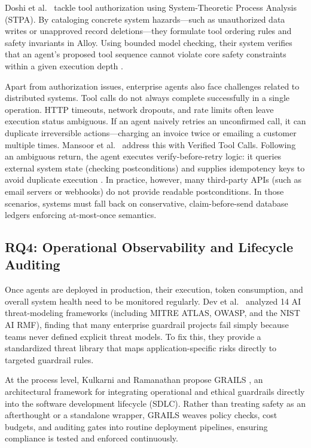 \documentclass[sigconf]{acmart}
\begin{document}
Doshi et al.~\cite{doshi2026verifiablysafetooluse} tackle tool authorization using System-Theoretic Process Analysis (STPA). By cataloging concrete system hazards—such as unauthorized data writes or unapproved record deletions—they formulate tool ordering rules and safety invariants in Alloy. Using bounded model checking, their system verifies that an agent's proposed tool sequence cannot violate core safety constraints within a given execution depth \cite{doshi2026verifiablysafetooluse}.

Apart from authorization issues, enterprise agents also face challenges related to distributed systems. Tool calls do not always complete successfully in a single operation. HTTP timeouts, network dropouts, and rate limits often leave execution status ambiguous. If an agent naively retries an unconfirmed call, it can duplicate irreversible actions—charging an invoice twice or emailing a customer multiple times. Mansoor et al.~\cite{mansoor2026verifiedtoolcalls} address this with Verified Tool Calls. Following an ambiguous return, the agent executes verify-before-retry logic: it queries external system state (checking postconditions) and supplies idempotency keys to avoid duplicate execution \cite{mansoor2026verifiedtoolcalls}. In practice, however, many third-party APIs (such as email servers or webhooks) do not provide readable postconditions. In those scenarios, systems must fall back on conservative, claim-before-send database ledgers enforcing at-most-once semantics.

\subsection{RQ4: Operational Observability and Lifecycle Auditing}
Once agents are deployed in production, their execution, token consumption, and overall system health need to be monitored regularly. Dev et al.~\cite{dev2025threat} analyzed 14 AI threat-modeling frameworks (including MITRE ATLAS, OWASP, and the NIST AI RMF), finding that many enterprise guardrail projects fail simply because teams never defined explicit threat models. To fix this, they provide a standardized threat library that maps application-specific risks directly to targeted guardrail rules.

At the process level, Kulkarni and Ramanathan propose GRAILS \cite{kulkarni2025grails}, an architectural framework for integrating operational and ethical guardrails directly into the software development lifecycle (SDLC). Rather than treating safety as an afterthought or a standalone wrapper, GRAILS weaves policy checks, cost budgets, and auditing gates into routine deployment pipelines, ensuring compliance is tested and enforced continuously.
\end{document}
